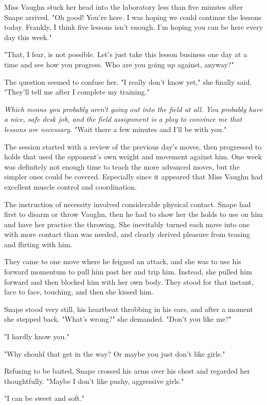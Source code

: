 \documentclass[a4paper,11pt]{article}
\begin{document}
Miss Vaughn stuck her head into the laboratory less than five minutes after Snape arrived. "Oh good! You're here. I was hoping we could continue the lessons today. Frankly, I think five lessons isn't enough. I'm hoping you can be here every day this week."

"That, I fear, is not possible. Let's just take this lesson business one day at a time and see how you progress. Who are you going up against, anyway?"

The question seemed to confuse her. "I really don't know yet," she finally said. "They'll tell me after I complete my training."

\emph{Which means you probably aren't going out into the field at all. You probably have a nice, safe desk job, and the field assignment is a ploy to convince me that lessons are necessary.} "Wait there a few minutes and I'll be with you."

The session started with a review of the previous day's moves, then progressed to holds that used the opponent's own weight and movement against him. One week was definitely not enough time to teach the more advanced moves, but the simpler ones could be covered. Especially since it appeared that Miss Vaughn had excellent muscle control and coordination.

The instruction of necessity involved considerable physical contact. Snape had first to disarm or throw Vaughn, then he had to show her the holds to use on him and have her practice the throwing. She inevitably turned each move into one with more contact than was needed, and clearly derived pleasure from teasing and flirting with him.

They came to one move where he feigned an attack, and she was to use his forward momentum to pull him past her and trip him. Instead, she pulled him forward and then blocked him with her own body. They stood for that instant, face to face, touching, and then she kissed him.

Snape stood very still, his heartbeat throbbing in his ears, and after a moment she stepped back. "What's wrong?" she demanded. "Don't you like me?"

"I hardly know you."

"Why should that get in the way? Or maybe you just don't like girls."

Refusing to be baited, Snape crossed his arms over his chest and regarded her thoughtfully. "Maybe I don't like pushy, aggressive girls."

"I can be sweet and soft."
\end{document}
